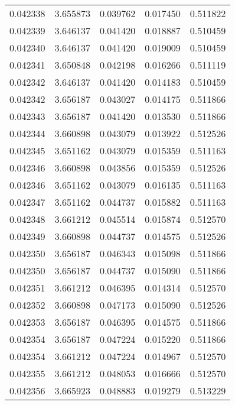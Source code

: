 \begin{tabular}{lrrrr}
0.042338    &  3.655873 &  0.039762 &  0.017450 &             0.511822 \\
0.042339    &  3.646137 &  0.041420 &  0.018887 &             0.510459 \\
0.042340    &  3.646137 &  0.041420 &  0.019009 &             0.510459 \\
0.042341    &  3.650848 &  0.042198 &  0.016266 &             0.511119 \\
0.042342    &  3.646137 &  0.041420 &  0.014183 &             0.510459 \\
0.042342    &  3.656187 &  0.043027 &  0.014175 &             0.511866 \\
0.042343    &  3.656187 &  0.041420 &  0.013530 &             0.511866 \\
0.042344    &  3.660898 &  0.043079 &  0.013922 &             0.512526 \\
0.042345    &  3.651162 &  0.043079 &  0.015359 &             0.511163 \\
0.042346    &  3.660898 &  0.043856 &  0.015359 &             0.512526 \\
0.042346    &  3.651162 &  0.043079 &  0.016135 &             0.511163 \\
0.042347    &  3.651162 &  0.044737 &  0.015882 &             0.511163 \\
0.042348    &  3.661212 &  0.045514 &  0.015874 &             0.512570 \\
0.042349    &  3.660898 &  0.044737 &  0.014575 &             0.512526 \\
0.042350    &  3.656187 &  0.046343 &  0.015098 &             0.511866 \\
0.042350    &  3.656187 &  0.044737 &  0.015090 &             0.511866 \\
0.042351    &  3.661212 &  0.046395 &  0.014314 &             0.512570 \\
0.042352    &  3.660898 &  0.047173 &  0.015090 &             0.512526 \\
0.042353    &  3.656187 &  0.046395 &  0.014575 &             0.511866 \\
0.042354    &  3.656187 &  0.047224 &  0.015220 &             0.511866 \\
0.042354    &  3.661212 &  0.047224 &  0.014967 &             0.512570 \\
0.042355    &  3.661212 &  0.048053 &  0.016666 &             0.512570 \\
0.042356    &  3.665923 &  0.048883 &  0.019279 &             0.513229 \\

\end{tabular}
